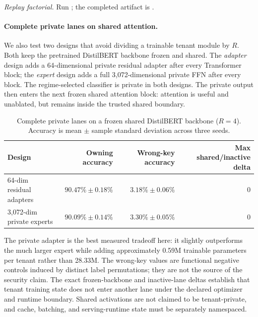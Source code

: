 \documentclass[11pt,a4paper]{article}
\begin{document}
\begin{sloppypar}
\noindent\textit{Replay factorial.} Run
; the completed
artifact is
.
\end{sloppypar}

\paragraph{Complete private lanes on shared attention.}
We also test two designs that avoid dividing a trainable tenant module
by $R$.  Both keep the pretrained DistilBERT backbone frozen and
shared.  The \emph{adapter} design adds a 64-dimensional private
residual adapter after every Transformer block; the \emph{expert}
design adds a full 3,072-dimensional private FFN after every block.
The regime-selected classifier is private in both designs.  The
private output then enters the next frozen shared attention block:
attention is useful and unablated, but remains inside the trusted
shared boundary.

\begin{table}[ht]
\centering
\caption{Complete private lanes on a frozen shared DistilBERT
backbone ($R{=}4$).  Accuracy is mean $\pm$ sample standard deviation
across three seeds.}
\label{tab:private-lanes}
\small
\begin{tabular}{@{}lrrr@{}}
\toprule
Design & Owning accuracy & Wrong-key accuracy &
Max shared/inactive delta \\
\midrule
64-dim residual adapters & $90.47\%\pm0.18\%$ &
$3.18\%\pm0.06\%$ & 0 \\
3,072-dim private experts & $90.09\%\pm0.14\%$ &
$3.30\%\pm0.05\%$ & 0 \\
\bottomrule
\end{tabular}
\end{table}

The private adapter is the best measured tradeoff here: it slightly
outperforms the much larger expert while adding approximately
0.59M trainable parameters per tenant rather than 28.33M.  The
wrong-key values are functional negative controls induced by distinct
label permutations; they are not the source of the security claim.
The exact frozen-backbone and inactive-lane deltas establish that
tenant training state does not enter another lane under the declared
optimizer and runtime boundary.  Shared activations are not claimed
to be tenant-private, and cache, batching, and serving-runtime state
must be separately namespaced.
\end{document}
